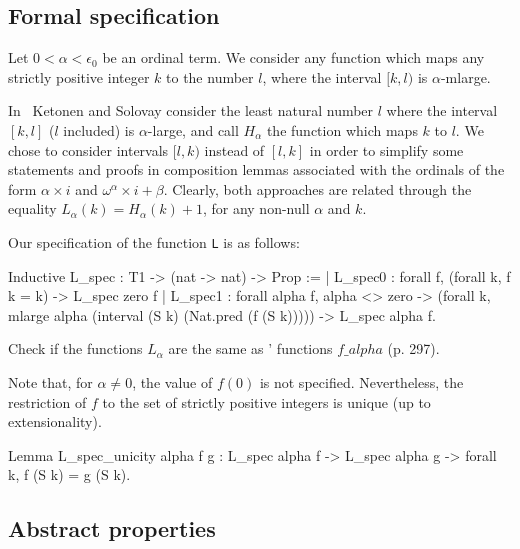 \subsection{Formal specification}


Let $0<\alpha<\epsilon_0$ be an ordinal term. We consider any  function which  maps  any strictly positive integer $k$ to the number $l$, where 
the interval $[k,l)$ is $\alpha$-mlarge.

\begin{remark}
In~\cite{KS81} Ketonen and Solovay consider the least natural number $l$ where the interval $[k,l]$ ($l$ included) is $\alpha$-large, and call $H_\alpha$ the function which maps $k$ to $l$. We chose to consider intervals $[l,k)$ instead of $[l,k]$
in order to simplify  some statements and proofs in composition lemmas associated with the ordinals of the form $\alpha\times i$ and 
$\omega^\alpha\times i + \beta$.
Clearly, both approaches are related through the equality
$L_\alpha(k)=H_\alpha(k)+1$, for any non-null $\alpha$ and $k$.
\end{remark}




Our specification of the function \texttt{L} is as follows:

\begin{Coqsrc}
Inductive L_spec : T1 -> (nat -> nat) -> Prop :=
| L_spec0 : forall f, (forall k, f k = k) ->  L_spec zero f
| L_spec1 : forall alpha f,
    alpha <> zero ->
    (forall k, mlarge alpha (interval (S k) (Nat.pred (f (S k))))) ->
    L_spec alpha f.
\end{Coqsrc}

\begin{todo}
 Check if the functions $L_\alpha$ are the same as
\cite{KS81}' functions $f\_alpha$ (p. 297).
\end{todo}


Note that, for $\alpha\not=0$, the value of $f(0)$ is not specified.
Nevertheless, the restriction of $f$ to the set of strictly positive integers is unique (up to extensionality).

\begin{Coqsrc}
Lemma L_spec_unicity alpha f g :
  L_spec alpha f -> L_spec alpha g -> forall k, f (S k) = g (S k).
\end{Coqsrc}


\subsection{Abstract properties}



